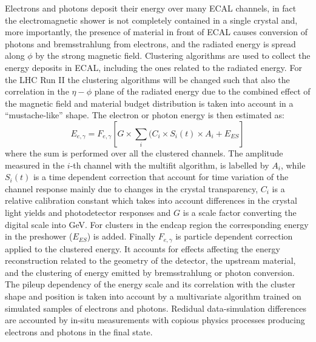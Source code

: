 \documentclass[journal]{IEEEtran}
\begin{document}
Electrons and photons deposit their energy over many ECAL channels, in fact the electromagnetic shower is not completely contained in a single crystal and, more importantly, the presence of material in front of ECAL causes conversion of photons and bremsstrahlung from electrons, and the radiated energy is spread along $\phi$ by the strong magnetic field. Clustering algorithms are used to collect the energy deposits in ECAL, including the ones related to the radiated energy. For the LHC Run II the clustering algorithms will be changed such that also the correlation in the $\eta-\phi$ plane of the radiated energy due to the combined effect of the magnetic field and material budget distribution is taken into account in a ``mustache-like'' shape. The electron or photon energy is then estimated as:
\begin{equation}
E_{e,\gamma} = F_{e,\gamma}\left[G \times \sum_i(C_i \times S_i(t) \times A_i + E_{ES}\right]
\end{equation}
where the sum is performed over all the clustered channels. The amplitude measured in the $i$-th channel with the multifit algorithm, is labelled by $A_i$, while $S_i(t)$ is a time dependent correction that account for time variation of the channel response mainly due to changes in the crystal transparency, $C_i$ is a relative calibration constant which takes into account differences in the crystal light yields and photodetector responses and $G$ is a scale factor converting the digital scale into GeV. For clusters in the endcap region the corresponding energy in the preshower ($E_{ES}$) is added. Finally $F_{e,\gamma}$ is particle dependent correction applied to the clustered energy. It accounts for effects affecting the energy reconstruction related to the geometry of the detector, the upstream material, and the clustering of energy emitted by bremsstrahlung or photon conversion. The pileup dependency of the energy scale and its correlation with the cluster shape and position is taken into account by a multivariate algorithm trained on simulated samples of electrons and photons.  Redidual data-simulation differences are accounted by in-situ measurements with copious physics processes producing electrons and photons in the final state.
\end{document}
